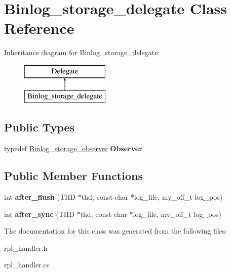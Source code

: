 \hypertarget{classBinlog__storage__delegate}{}\section{Binlog\+\_\+storage\+\_\+delegate Class Reference}
\label{classBinlog__storage__delegate}
Inheritance diagram for Binlog\+\_\+storage\+\_\+delegate\+:\begin{figure}[H]
\begin{center}
\leavevmode
\includegraphics[height=2.000000cm]{classBinlog__storage__delegate}
\end{center}
\end{figure}
\subsection*{Public Types}
\begin{DoxyCompactItemize}
\item 
\mbox{\label{classBinlog__storage__delegate_a302d1f2d03da63628b39ab41312b35db}} 
typedef \mbox{\hyperlink{structBinlog__storage__observer}{Binlog\+\_\+storage\+\_\+observer}} {\bfseries Observer}
\end{DoxyCompactItemize}
\subsection*{Public Member Functions}
\begin{DoxyCompactItemize}
\item 
\mbox{\label{classBinlog__storage__delegate_ad91571022c6080e52ec40290e72853de}} 
int {\bfseries after\+\_\+flush} (T\+HD $\ast$thd, const char $\ast$log\+\_\+file, my\+\_\+off\+\_\+t log\+\_\+pos)
\item 
\mbox{\label{classBinlog__storage__delegate_a448bf85ca66788d2a7c5271311853cef}} 
int {\bfseries after\+\_\+sync} (T\+HD $\ast$thd, const char $\ast$log\+\_\+file, my\+\_\+off\+\_\+t log\+\_\+pos)
\end{DoxyCompactItemize}


The documentation for this class was generated from the following files\+:\begin{DoxyCompactItemize}
\item 
rpl\+\_\+handler.\+h\item 
rpl\+\_\+handler.\+cc\end{DoxyCompactItemize}
